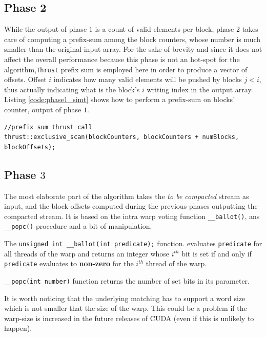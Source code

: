 \subsection{Phase 2}
While the output of phase $1$ is a count of valid elements per block, 
phase $2$ takes care of computing a prefix-sum among the block counters, whose number is much smaller than the original input array.
For the sake of brevity and since it does not affect the overall performance because this phase is not an hot-spot for the algorithm,\texttt{Thrust} prefix sum is employed here in order to produce a vector of offsets. Offset $i$ indicates how many valid elements will be pushed by blocks $j < i$, thus actually indicating what is the block's $i$ writing index in the output array.
Listing \ref{code:phase1_simt} shows how to perform a prefix-sum on blocks' counter, output of phase $1$.
\begin{lstlisting}
//prefix sum thrust call
thrust::exclusive_scan(blockCounters, blockCounters + numBlocks, blockOffsets);
\end{lstlisting}

\subsection{Phase $3$}
The most elaborate part of the algorithm takes the \textit{to be compacted} stream as input, and the block offsets computed during the previous phases outputting the compacted stream.
It is based on the intra warp voting function \texttt{\_\_ballot()}, ans \texttt{\_\_popc()} procedure and a bit of manipulation. 

The \verb|unsigned int __ballot(int predicate);| function.
evaluates \verb|predicate| for all threads of the warp and 
returns an integer whose $i^{th}$ bit is set if and only if \verb|predicate| evaluates to \textbf{non-zero} for the $i^{th}$ thread of the warp.

\verb|__popc(int number)| function returns the number of set bits in its parameter.

It is worth noticing that the underlying matching has to support a word size which is not smaller that the size of the warp. This could be a problem if the warp-size is increased in the future releases of CUDA (even if this is unlikely to happen).

